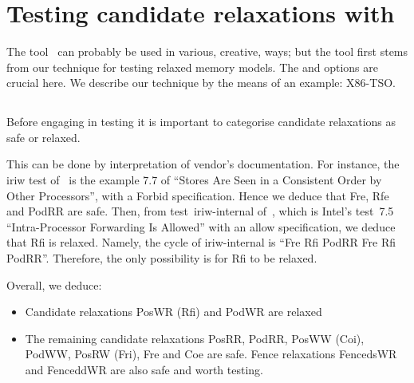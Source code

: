 \section{Testing\label{diy:intro} candidate relaxations with \diy}

The tool~\diy{} can probably be used in various, creative, ways;
but the tool first stems from our technique for testing relaxed memory
models.
The  and  options are crucial here.
We describe our technique by the means of an example: X86-TSO.

\subsection{}

Before engaging in testing it is important to categorise
candidate relaxations as safe or relaxed.

This can be done by interpretation of vendor's documentation.
For instance, the iriw test of~\mysec{\ref{iriw}} is the example 7.7 of
\cite{intel:white}
``Stores Are Seen in a Consistent Order by Other Processors'',
with a Forbid specification.
Hence we deduce that Fre, Rfe and PodRR are safe.
Then, from test~iriw-internal of~\mysec{\ref{iriw}},
which is Intel's test~7.5 ``Intra-Processor Forwarding Is Allowed''
with an allow specification,
we deduce that Rfi is relaxed.
Namely, the cycle of iriw-internal is
``Fre Rfi PodRR Fre Rfi PodRR''. Therefore, the only possibility is for
Rfi to be relaxed.

Overall, we deduce:
\begin{itemize}
\item Candidate relaxations PosWR (Rfi) and PodWR are relaxed
\item The remaining candidate relaxations PosRR, PodRR, PosWW (Coi),  PodWW,
PosRW (Fri), Fre and Coe are safe.
Fence relaxations FencedsWR and FenceddWR are also safe
and worth testing.
\end{itemize}

